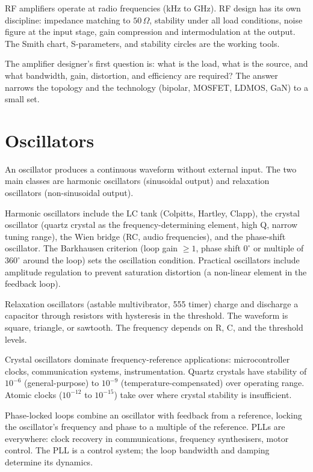 RF amplifiers operate at radio frequencies (kHz to GHz). RF design has its own discipline: impedance matching to $50\,\Omega$, stability under all load conditions, noise figure at the input stage, gain compression and intermodulation at the output. The Smith chart, S-parameters, and stability circles are the working tools.

The amplifier designer's first question is: what is the load, what is the source, and what bandwidth, gain, distortion, and efficiency are required? The answer narrows the topology and the technology (bipolar, MOSFET, LDMOS, GaN) to a small set.

\section{Oscillators}

An oscillator produces a continuous waveform without external input. The two main classes are harmonic oscillators (sinusoidal output) and relaxation oscillators (non-sinusoidal output).

Harmonic oscillators include the LC tank (Colpitts, Hartley, Clapp), the crystal oscillator (quartz crystal as the frequency-determining element, high Q, narrow tuning range), the Wien bridge (RC, audio frequencies), and the phase-shift oscillator. The Barkhausen criterion (loop gain $\geq 1$, phase shift $0^\circ$ or multiple of $360^\circ$ around the loop) sets the oscillation condition. Practical oscillators include amplitude regulation to prevent saturation distortion (a non-linear element in the feedback loop).

Relaxation oscillators (astable multivibrator, 555 timer) charge and discharge a capacitor through resistors with hysteresis in the threshold. The waveform is square, triangle, or sawtooth. The frequency depends on R, C, and the threshold levels.

Crystal oscillators dominate frequency-reference applications: microcontroller clocks, communication systems, instrumentation. Quartz crystals have stability of $10^{-6}$ (general-purpose) to $10^{-9}$ (temperature-compensated) over operating range. Atomic clocks ($10^{-12}$ to $10^{-15}$) take over where crystal stability is insufficient.

Phase-locked loops combine an oscillator with feedback from a reference, locking the oscillator's frequency and phase to a multiple of the reference. PLLs are everywhere: clock recovery in communications, frequency synthesisers, motor control. The PLL is a control system; the loop bandwidth and damping determine its dynamics.

